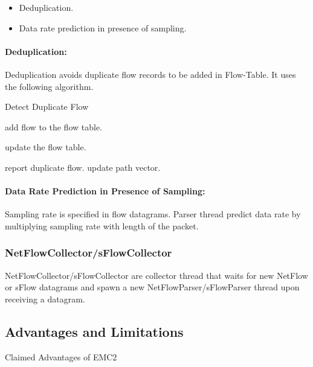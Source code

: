 	\begin{itemize}
	 \item Deduplication.
	 \item Data rate prediction in presence of sampling.
	\end{itemize}
   
   \paragraph{Deduplication:}
       Deduplication avoids duplicate flow records to be added in Flow-Table. It uses the following algorithm.
       
     \begin{algorithm}[H]
        \caption{Detect Duplicate Flow}
	\label{alg1}

	\begin{algorithmic}

	      \STATE add flow to the flow table.
	      \RETURN 

	  \ELSE 

		  \STATE update the flow table.
		  \RETURN 

	      \ELSE

	        \STATE report duplicate flow.
	        \STATE update path vector.
	        \RETURN 

	      \ENDIF

	  \ENDIF

	\end{algorithmic}

       \end{algorithm}

    \paragraph{Data Rate Prediction in Presence of Sampling:}
       Sampling rate is specified in flow datagrams. Parser thread predict data rate by multiplying  sampling
       rate with length of the packet.
    
    \subsubsection{NetFlowCollector/sFlowCollector}
      NetFlowCollector/sFlowCollector are collector thread that waits for new NetFlow or sFlow datagrams and
      spawn a new NetFlowParser/sFlowParser thread upon receiving a datagram.
      
    \subsection{Advantages and Limitations}
    Claimed Advantages of EMC2 

